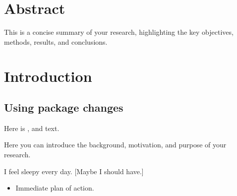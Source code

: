 \documentclass{article}
\begin{document}
\newpage
\tableofcontents %
\newpage

\section*{Abstract}

This is a concise summary of your research, highlighting the key objectives, methods, results, and conclusions. 

\section{Introduction}

\subsection{Using package changes}

Here is ,  and  text. 


Here you can introduce the background, motivation, and purpose of your research. 

I feel sleepy every day.  [Maybe I should have.]

\begin{itemize}
  \item Immediate plan of action.
\end{itemize}

\end{document}
